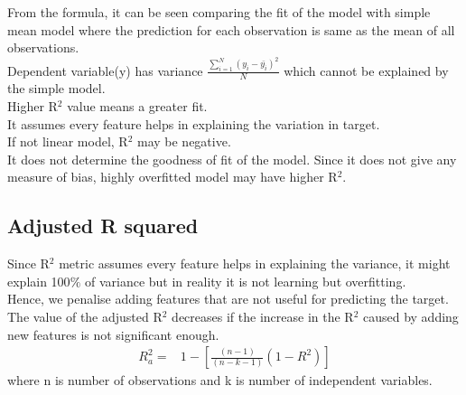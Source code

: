 \documentclass[12pt,letterpaper, onecolumn]{exam}
\begin{document}
 From the formula, it can be seen comparing the fit of the model with simple mean model where the prediction for each observation is same as the mean of all observations.\\
 Dependent variable(y) has variance $\frac{\sum_{i=1}^N(y_i-\bar{y_i})^2}{N}$ which cannot be explained by the simple model.\\
 Higher R$^{2}$ value means a greater fit.\\
 It assumes every feature helps in explaining the variation in target.\\ If not linear model,  R$^{2}$ may be negative.  
 \\ 
 It does not determine the goodness of fit of the model.
 Since it does not give any measure of bias, highly overfitted model may have higher R$^{2}$.
 
 \subsection*{Adjusted R squared}
 Since R$^{2}$ metric assumes every feature helps in explaining the variance, it might explain 100$\%$ of variance but in reality it is not learning but overfitting.\\
 Hence, we penalise adding features that are not useful for predicting the target. The value of the adjusted  R$^{2}$ decreases if the increase in the  R$^{2}$ caused by adding new features is not significant enough.
 \begin{align*}
 R_a^2 ={}&  1-[\frac{(n-1)}{(n-k-1)}(1-R^2)]
 \end{align*}
 where n  is number of observations and k is number of independent variables.
 
 
 
\end{document}
